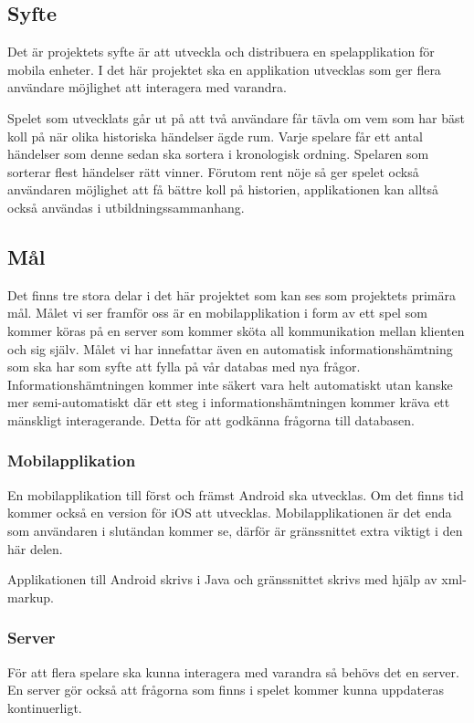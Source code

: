 \documentclass[12pt,a4paper]{article}
\begin{document}
\subsection{Syfte}
Det är projektets syfte är att utveckla och distribuera en spelapplikation för mobila enheter. I det här projektet ska en applikation utvecklas som ger flera användare möjlighet att interagera med varandra.

Spelet som utvecklats går ut på att två användare får tävla om vem som har bäst koll på när olika historiska händelser ägde rum. Varje spelare får ett antal händelser som denne sedan ska sortera i kronologisk ordning. Spelaren som sorterar flest händelser rätt vinner. Förutom rent nöje så ger spelet också användaren möjlighet att få bättre koll på historien, applikationen kan alltså också användas i utbildningssammanhang.

\subsection{Mål}
Det finns tre stora delar i det här projektet som kan ses som projektets primära mål. Målet vi ser framför oss är en mobilapplikation i form av ett spel som kommer köras på en server som kommer sköta all kommunikation mellan klienten och sig själv. Målet vi har innefattar även en automatisk informationshämtning som ska har som syfte att fylla på vår databas med nya frågor. Informationshämtningen kommer inte säkert vara helt automatiskt utan kanske mer semi-automatiskt där ett steg i informationshämtningen kommer kräva ett mänskligt interagerande. Detta för att godkänna frågorna till databasen. 


\subsubsection{Mobilapplikation}
En mobilapplikation till först och främst Android ska utvecklas. Om det finns tid kommer också en version för iOS att utvecklas. Mobilapplikationen är det enda som användaren i slutändan kommer se, därför är gränssnittet extra viktigt i den här delen. 

Applikationen till Android skrivs i Java och gränssnittet skrivs med hjälp av xml-markup.

\subsubsection{Server}
För att flera spelare ska kunna interagera med varandra så behövs det en server. En server gör också att frågorna som finns i spelet kommer kunna uppdateras kontinuerligt.
\end{document}
